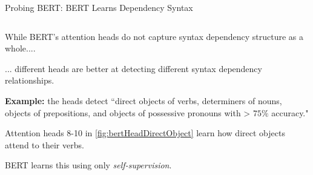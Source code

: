 \begin{frame}{Probing BERT: BERT Learns Dependency Syntax}
\begin{columns}
\begin{column}{0.4\textwidth}
\begin{itemizeSpaced}{2pt}
                \item  While BERT's attention heads do not capture syntax dependency structure as a whole....
            
                \item ... different heads are better at detecting different syntax dependency relationships.
                
                \item \textbf{Example: }the heads detect ``direct objects of verbs, determiners of nouns, objects of prepositions, and objects of possessive pronouns with > $75 \%$ accuracy."
                
                \item Attention heads 8-10 in \cref{fig:bertHeadDirectObject} learn how direct objects attend to their verbs. 
                
                \item BERT learns this using only \textit{self-supervision}. 
            \end{itemizeSpaced}
        \end{column}
    
    \end{columns}


\end{frame}





